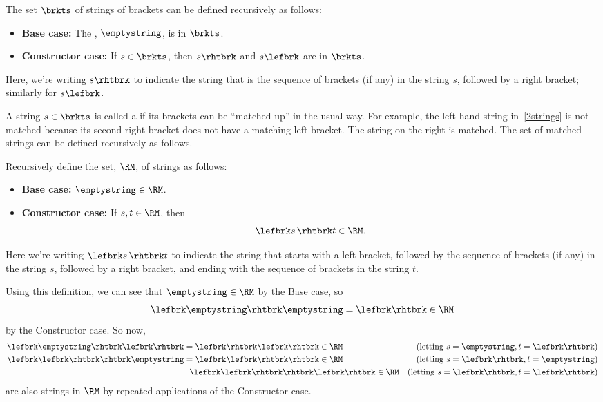 \begin{definition}\label{prns-def}
The set $\brkts$ of strings of brackets can be defined recursively as
follows:
\begin{itemize}

\item \textbf{Base case:} The , $\emptystring$, is in
  $\brkts$.

\item \textbf{Constructor case:} If $s \in \brkts$, then
$s\rhtbrk$ and $s\lefbrk$ are in $\brkts$.

\end{itemize}

\end{definition}

Here, we're writing $s\rhtbrk$ to indicate the string that is the sequence
of brackets (if any) in the string $s$, followed by a right bracket;
similarly for $s\lefbrk$.

A string $s \in \brkts$ is called a  if its
brackets can be ``matched up'' in the usual way.  For example, the left hand
string in~\ref{2strings} is not matched because its second right
bracket does not 
have a matching left bracket.  The string on the right is matched.
The set of matched strings can be defined recursively as follows.

\begin{definition}\label{RM-def}
Recursively define the set, $\RM$, of strings as follows:
\begin{itemize}

\item \textbf{Base case:} $\emptystring \in\RM$.

\item \textbf{Constructor case:} If $s,t \in\RM$, then
\[
\lefbrk s\, \rhtbrk t \in\RM.
\]

\end{itemize}

\end{definition}

Here we're writing $\lefbrk s\, \rhtbrk t$ to indicate the string that
starts with a left bracket, followed by the sequence of brackets
(if any) in the string $s$, followed by a right bracket, and ending
with the sequence of brackets in the string $t$.

Using this definition, we can see that $\emptystring \in\RM$ by the Base
case, so
\[
\lefbrk\emptystring\rhtbrk\emptystring=\lefbrk\rhtbrk\in\RM
\]
by the Constructor case.  So now,
\begin{align*}
\lefbrk\emptystring\rhtbrk\lefbrk\rhtbrk &= \lefbrk\rhtbrk\lefbrk\rhtbrk \in \RM
    & \text{(letting $s = \emptystring, t = \lefbrk\rhtbrk$)}\\
\lefbrk\lefbrk\rhtbrk\rhtbrk\emptystring & = \lefbrk\lefbrk\rhtbrk\rhtbrk \in \RM
    & \text{(letting $s = \lefbrk\rhtbrk, t = \emptystring$)}\\
&\ \ \lefbrk\lefbrk\rhtbrk\rhtbrk\lefbrk\rhtbrk \in \RM
    & \text{(letting $s = \lefbrk\rhtbrk, t = \lefbrk\rhtbrk$)}
\end{align*}
are also strings in $\RM$ by repeated applications of the Constructor
case.

